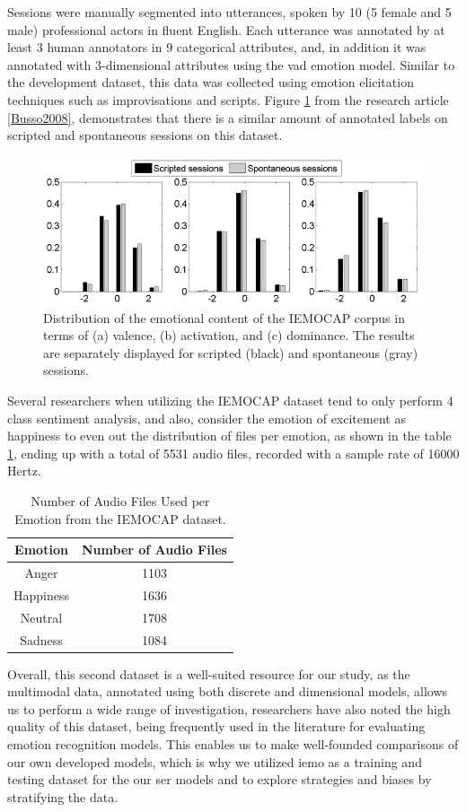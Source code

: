 Sessions were manually segmented into utterances, spoken by 10 (5 female and 5 male) professional actors in fluent English. Each utterance was annotated by at least 3 human annotators in 9 categorical attributes, and, in addition it was annotated with 3-dimensional attributes using the \ac{vad} emotion model. Similar to the development dataset, this data was collected using emotion elicitation techniques such as improvisations and scripts. Figure \ref{fig:bar_plots_distribution} from the research article \ref{Busso2008}, demonstrates that there is a similar amount of annotated labels on scripted and spontaneous sessions on this dataset.

\begin{figure}[H]
	\centering
	\includegraphics[width=.8\linewidth]{figs/4_1_traditional/scripted_spont_distribution.png}
	\caption{Distribution of the emotional content of the IEMOCAP corpus in terms of (a) valence, (b) activation, and (c) dominance. The results are separately displayed for scripted (black) and spontaneous (gray) sessions.}
	\label{fig:bar_plots_distribution}
\end{figure}

Several researchers when utilizing the IEMOCAP dataset tend to only perform 4 class sentiment analysis, and also, consider the emotion of excitement as happiness to even out the distribution of files per emotion, as shown in the table \ref{tab:dataDist}, ending up with a total of 5531 audio files, recorded with a sample rate of 16000 Hertz.

\begin{table}[H]
	\centering
	\caption{Number of Audio Files Used per Emotion from the IEMOCAP dataset.}
	\label{tab:dataDist}
	\begin{tabular}{cc}
		\toprule
		Emotion & Number of Audio Files \\
		\midrule
		Anger & 1103\\
		Happiness &  1636\\
		Neutral &  1708\\
		Sadness & 1084\\
		\bottomrule
	\end{tabular}
\end{table}


Overall, this second dataset is a well-suited resource for our study, as the multimodal data, annotated using both discrete and dimensional models, allows us to perform a wide range of investigation, researchers have also noted the high quality of this dataset, being frequently used in the literature for evaluating emotion recognition models. This enables us to make well-founded comparisons of our own developed models, which is why we utilized \ac{iemo} as a training and testing dataset for the our \ac{ser} models and to explore strategies and biases by stratifying the data.
